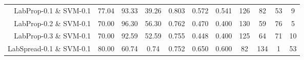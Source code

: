 \begin{table}[!htb]
\begin{tabular}{r|c|c|c|c|c|c|c|c|c|c}
LabProp-0.1 \& SVM-0.1 & 77.04 & 93.33 & 39.26 & 0.803 & 0.572 & 0.541 & 126 & 82 & 53 & 9 \\ 
LabProp-0.2 \& SVM-0.1 & 70.00 & 96.30 & 56.30 & 0.762 & 0.470 & 0.400 & 130 & 59 & 76 & 5 \\ 
LabProp-0.3 \& SVM-0.1 & 70.00 & 92.59 & 52.59 & 0.755 & 0.448 & 0.400 & 125 & 64 & 71 & 10 \\ 
LabSpread-0.1 \& SVM-0.1 & 80.00 & 60.74 & 0.74 & 0.752 & 0.650 & 0.600 & 82 & 134 & 1 & 53 \\ 
\hline\hline
\end{tabular}
\end{table}
